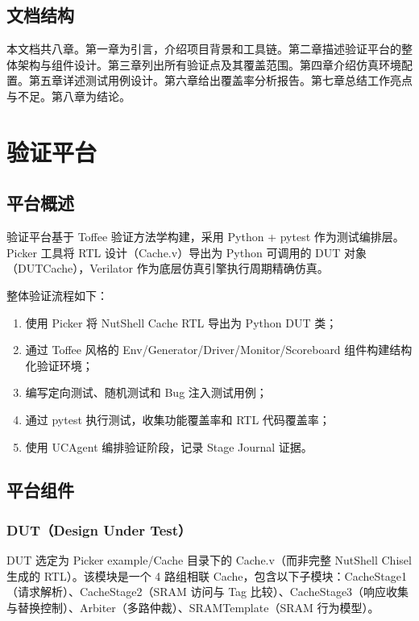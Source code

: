\documentclass[12pt,a4paper]{ctexart}
\begin{document}
\subsection{文档结构}

本文档共八章。第一章为引言，介绍项目背景和工具链。第二章描述验证平台的整体架构与组件设计。第三章列出所有验证点及其覆盖范围。第四章介绍仿真环境配置。第五章详述测试用例设计。第六章给出覆盖率分析报告。第七章总结工作亮点与不足。第八章为结论。

\newpage

\section{验证平台}

\subsection{平台概述}

验证平台基于 Toffee 验证方法学构建，采用 Python + pytest 作为测试编排层。Picker 工具将 RTL 设计（Cache.v）导出为 Python 可调用的 DUT 对象（DUTCache），Verilator 作为底层仿真引擎执行周期精确仿真。

整体验证流程如下：
\begin{enumerate}[leftmargin=*]
  \item 使用 Picker 将 NutShell Cache RTL 导出为 Python DUT 类；
  \item 通过 Toffee 风格的 Env/Generator/Driver/Monitor/Scoreboard 组件构建结构化验证环境；
  \item 编写定向测试、随机测试和 Bug 注入测试用例；
  \item 通过 pytest 执行测试，收集功能覆盖率和 RTL 代码覆盖率；
  \item 使用 UCAgent 编排验证阶段，记录 Stage Journal 证据。
\end{enumerate}

\subsection{平台组件}

\subsubsection{DUT（Design Under Test）}

DUT 选定为 Picker example/Cache 目录下的 Cache.v（而非完整 NutShell Chisel 生成的 RTL）。该模块是一个 4 路组相联 Cache，包含以下子模块：CacheStage1（请求解析）、CacheStage2（SRAM 访问与 Tag 比较）、CacheStage3（响应收集与替换控制）、Arbiter（多路仲裁）、SRAMTemplate（SRAM 行为模型）。
\end{document}

